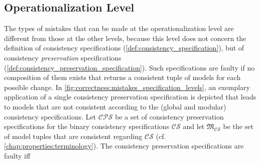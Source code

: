 \subsection{Operationalization Level}
The types of mistakes that can be made at the operationalization level are different from those at the other levels, because this level does not concern the definition of consistency specifications (\autoref{def:consistency_specification}), but of consistency \emph{preservation} specifications (\autoref{def:consistency_preservation_specification}).
Such specifications are faulty if no composition of them exists that returns a consistent tuple of models for each possible change. %
In \autoref{fig:correctness:mistakes_specification_levels}, an exemplary application of a single consistency preservation specification is depicted that leads to models that are not consistent according to the (global and modular) consistency specifications.
Let $\mathcal{CPS}$ be a set of consistency preservation specifications  %
for the binary consistency specifications $\mathcal{CS}$ %
and
let $\mathfrak{M}_{\mathcal{CS}}$ be the set of model tuples that are consistent regarding $\mathcal{CS}$ (cf. \autoref{chap:properties:terminology}). 
The consistency preservation specifications are faulty iff
